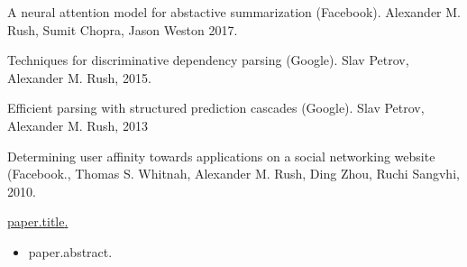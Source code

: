 \documentclass[10pt]{article}
\begin{document}
{ \bigskip
{}

\ind A neural attention model for abstactive summarization (Facebook). Alexander M. Rush, Sumit Chopra, Jason Weston 2017.
\medskip

\ind Techniques for discriminative dependency parsing (Google). Slav Petrov, Alexander M. Rush, 2015.
\medskip

\ind Efficient parsing with structured prediction cascades (Google). Slav Petrov, Alexander M. Rush, 2013
\medskip

\ind  Determining user affinity towards applications on a social networking website (Facebook., Thomas S. Whitnah, Alexander M. Rush, Ding Zhou, Ruchi Sangvhi, 2010.



\bigskip


\bigskip
{%
\ind \href{ paper.link } { {{paper.title}}. }
\begin{itemize}
\item {{paper.abstract}}.
\end{itemize}
\medskip

{%










}}}
\end{document}
